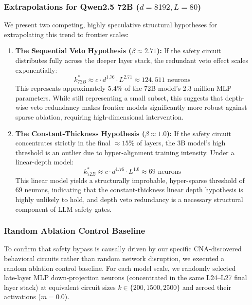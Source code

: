 \documentclass[11pt]{article}
\begin{document}
\subsubsection{Extrapolations for Qwen2.5 72B ($d=8192, L=80$)}
We present two competing, highly speculative structural hypotheses for extrapolating this trend to frontier scales:
\begin{enumerate}
    \item \textbf{The Sequential Veto Hypothesis ($\beta \approx 2.71$):}
       If the safety circuit distributes fully across the deeper layer stack, the redundant veto effect scales exponentially:
       \begin{equation}
       k^*_{72B} \approx c \cdot d^{1.76} \cdot L^{2.71} \approx 124,511 \text{ neurons}
       \end{equation}
       This represents approximately $5.4\%$ of the 72B model's 2.3 million MLP parameters. While still representing a small subset, this suggests that depth-wise veto redundancy makes frontier models significantly more robust against sparse ablation, requiring high-dimensional intervention.
    \item \textbf{The Constant-Thickness Hypothesis ($\beta \approx 1.0$):}
       If the safety circuit concentrates strictly in the final $\approx 15\%$ of layers, the 3B model's high threshold is an outlier due to hyper-alignment training intensity. Under a linear-depth model:
       \begin{equation}
       k^*_{72B} \approx c \cdot d^{1.76} \cdot L^{1.0} \approx 69 \text{ neurons}
       \end{equation}
       This linear model yields a structurally improbable, hyper-sparse threshold of 69 neurons, indicating that the constant-thickness linear depth hypothesis is highly unlikely to hold, and depth veto redundancy is a necessary structural component of LLM safety gates.
\end{enumerate}

\subsubsection{Random Ablation Control Baseline}
To confirm that safety bypass is causally driven by our specific CNA-discovered behavioral circuits rather than random network disruption, we executed a random ablation control baseline. For each model scale, we randomly selected late-layer MLP down-projection neurons (concentrated in the same L24--L27 final layer stack) at equivalent circuit sizes $k \in \{200, 1500, 2500\}$ and zeroed their activations ($m=0.0$).
\end{document}
